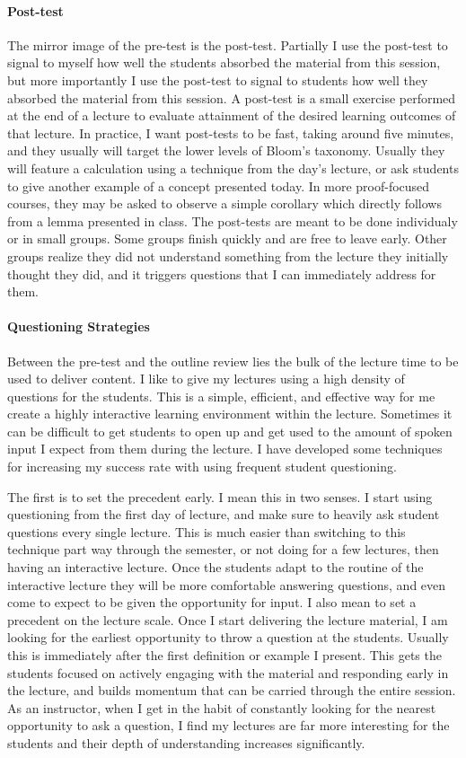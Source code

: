 \documentclass{article}
\begin{document}
\paragraph{Post-test}The mirror image of the pre-test is the post-test. Partially I use the post-test to signal to myself how well the students absorbed the material from this session, but more importantly I use the post-test to signal to students how well they absorbed the material from this session. A post-test is a small exercise performed at the end of a lecture to evaluate attainment of the desired learning outcomes of that lecture. In practice, I want post-tests to be fast, taking around five minutes, and they usually will target the lower levels of Bloom's taxonomy. Usually they will feature a calculation using a technique from the day's lecture, or ask students to give another example of a concept presented today. In more proof-focused courses, they may be asked to observe a simple corollary which directly follows from a lemma presented in class. The post-tests are meant to be done individualy or in small groups. Some groups finish quickly and are free to leave early. Other groups realize they did not understand something from the lecture they initially thought they did, and it triggers questions that I can immediately address for them.

\paragraph{Questioning Strategies}Between the pre-test and the outline review lies the bulk of the lecture time to be used to deliver content. I like to give my lectures using a high density of questions for the students. This is a simple, efficient, and effective way for me create a highly interactive learning environment within the lecture. Sometimes it can be difficult to get students to open up and get used to the amount of spoken input I expect from them during the lecture. I have developed some techniques for increasing my success rate with using frequent student questioning. 

The first is to set the precedent early. I mean this in two senses. I start using questioning from the first day of lecture, and make sure to heavily ask student questions every single lecture. This is much easier than switching to this technique part way through the semester, or not doing for a few lectures, then having an interactive lecture. Once the students adapt to the routine of the interactive lecture they will be more comfortable answering questions, and even come to expect to be given the opportunity for input. I also mean to set a precedent on the lecture scale. Once I start delivering the lecture material, I am looking for the earliest opportunity to throw a question at the students. Usually this is immediately after the first definition or example I present. This gets the students focused on actively engaging with the material and responding early in the lecture, and builds momentum that can be carried through the entire session. As an instructor, when I get in the habit of constantly looking for the nearest opportunity to ask a question, I find my lectures are far more interesting for the students and their depth of understanding increases significantly.
\end{document}
